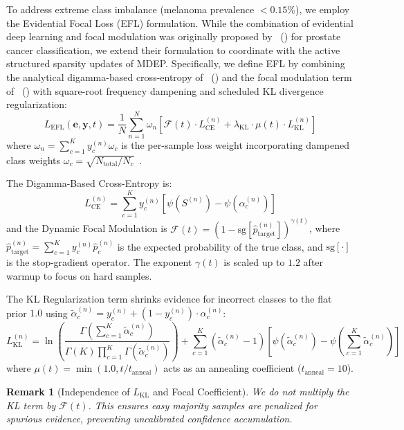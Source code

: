 \documentclass[letterpaper]{article} %
\newtheorem{remark}{Remark}
\begin{document}
To address extreme class imbalance (melanoma prevalence $<0.15\%$), we employ the Evidential Focal Loss (EFL) formulation. While the combination of evidential deep learning and focal modulation was originally proposed by \citeauthor{zhou2023domain}~(\citeyear{zhou2023domain}) for prostate cancer classification, we extend their formulation to coordinate with the active structured sparsity updates of MDEP. Specifically, we define EFL by combining the analytical digamma-based cross-entropy of \citeauthor{sensoy2018evidential}~(\citeyear{sensoy2018evidential}) and the focal modulation term of \citeauthor{lin2017focal}~(\citeyear{lin2017focal}) with square-root frequency dampening and scheduled KL divergence regularization:
\begin{equation}\label{eq:efl}
    L_{\text{EFL}}(\bm{e}, \bm{y}, t) = \frac{1}{N} \sum_{n=1}^N \omega_n \left[\mathcal{F}(t) \cdot L_{\text{CE}}^{(n)} + \lambda_{\text{KL}} \cdot \mu(t) \cdot L_{\text{KL}}^{(n)}\right]
\end{equation}
where $\omega_n = \sum_{c=1}^K y_c^{(n)} \omega_c$ is the per-sample loss weight incorporating dampened class weights $\omega_c = \sqrt{N_{\text{total}} / N_c}$~\cite{cui2019class}. 

The Digamma-Based Cross-Entropy is:
\begin{equation}
    L_{\text{CE}}^{(n)} = \sum_{c=1}^K y_c^{(n)} \left[\psi(S^{(n)}) - \psi(\alpha_c^{(n)})\right]
\end{equation}
and the Dynamic Focal Modulation is $\mathcal{F}(t) = (1 - \text{sg}[\hat{p}_{\text{target}}^{(n)}])^{\gamma(t)}$, where $\hat{p}_{\text{target}}^{(n)} = \sum_{c=1}^K y_c^{(n)} \hat{p}_c^{(n)}$ is the expected probability of the true class, and $\text{sg}[\cdot]$ is the stop-gradient operator. The exponent $\gamma(t)$ is scaled up to $1.2$ after warmup to focus on hard samples.

The KL Regularization term shrinks evidence for incorrect classes to the flat prior $1.0$ using $\tilde{\alpha}_c^{(n)} = y_c^{(n)} + (1 - y_c^{(n)}) \cdot \alpha_c^{(n)}$:
\begin{equation}\label{eq:kl_loss_n}
    L_{\text{KL}}^{(n)} = \ln \left( \frac{\Gamma\left(\sum_{c=1}^K \tilde{\alpha}_c^{(n)}\right)}{\Gamma(K) \prod_{c=1}^K \Gamma(\tilde{\alpha}_c^{(n)})} \right) + \sum_{c=1}^K (\tilde{\alpha}_c^{(n)} - 1)\left[\psi(\tilde{\alpha}_c^{(n)}) - \psi\!\left(\sum_{c=1}^K \tilde{\alpha}_c^{(n)}\right)\right]
\end{equation}
where $\mu(t) = \min(1.0, t / t_{\text{anneal}})$ acts as an annealing coefficient ($t_{\text{anneal}} = 10$).
\begin{remark}[Independence of $L_{\text{KL}}$ and Focal Coefficient]
We do not multiply the KL term by $\mathcal{F}(t)$. This ensures easy majority samples are penalized for spurious evidence, preventing uncalibrated confidence accumulation.
\end{remark}
\end{document}
